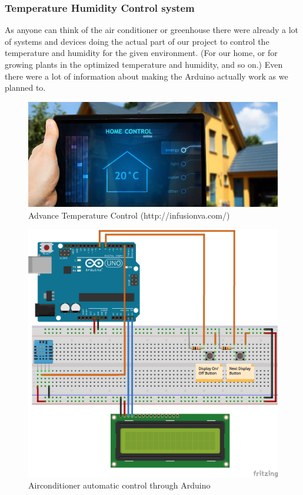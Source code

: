 \documentclass[conference]{IEEEtran}
\begin{document}
\subsubsection{Temperature Humidity Control system}
As anyone can think of the air conditioner or greenhouse there were already a lot of systems and devices doing the actual part of our project to control the temperature and humidity for the given environment. (For our home, or for growing plants in the optimized temperature and humidity, and so on.) Even there were a lot of information about making the Arduino actually work as we planned to.
\begin{figure}[H]
\begin{center}
    \includegraphics[scale=1.2]{temperature_control}
    \caption{Advance Temperature Control (http://infusionva.com/)} \label{fig:label}
\end{center}
\end{figure}

\begin{figure}[H]
\begin{center}
    \includegraphics[scale=0.4]{arduino}
    \caption{Airconditioner automatic control through Arduino} \label{fig:label}
\end{center}
\end{figure}
\end{document}
